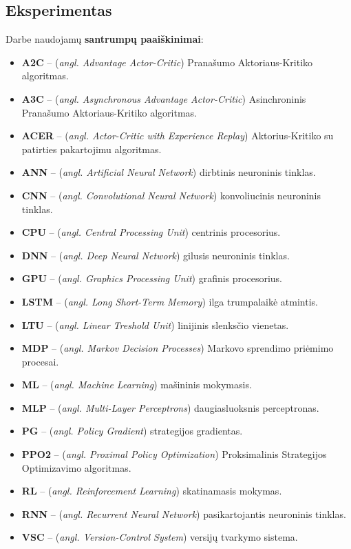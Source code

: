 \documentclass{VUMIFPSbakalaurinis}
\begin{document}
\subsection{Eksperimentas}

\printbibliography[heading=bibintoc] 

{
	Darbe naudojamų \textbf{santrumpų paaiškinimai}:
	\begin{itemize}
		\item \textbf{A2C} -- (\textit{angl. Advantage Actor-Critic}) Pranašumo Aktoriaus-Kritiko algoritmas.
		\item \textbf{A3C} -- (\textit{angl. Asynchronous Advantage Actor-Critic}) Asinchroninis Pranašumo Aktoriaus-Kritiko algoritmas.
		\item \textbf{ACER} -- (\textit{angl. Actor-Critic with Experience Replay}) Aktorius-Kritiko su patirties pakartojimu algoritmas.
		\item \textbf{ANN} -- (\textit{angl. Artificial Neural Network}) dirbtinis neuroninis tinklas.
		\item \textbf{CNN} -- (\textit{angl. Convolutional Neural Network}) konvoliucinis neuroninis tinklas.
		\item \textbf{CPU} -- (\textit{angl. Central Processing Unit}) centrinis procesorius.
		\item \textbf{DNN} -- (\textit{angl. Deep Neural Network}) gilusis neuroninis tinklas.
		\item \textbf{GPU} -- (\textit{angl. Graphics Processing Unit}) grafinis procesorius.
		\item \textbf{LSTM} -- (\textit{angl. Long Short-Term Memory}) ilga trumpalaikė atmintis.
		\item \textbf{LTU} -- (\textit{angl. Linear Treshold Unit}) linijinis slenksčio vienetas.
		\item \textbf{MDP} -- (\textit{angl. Markov Decision Processes}) Markovo sprendimo priėmimo procesai.
		\item \textbf{ML} -- (\textit{angl. Machine Learning}) mašininis mokymasis.
		\item \textbf{MLP} -- (\textit{angl. Multi-Layer Perceptrons}) daugiasluoksnis perceptronas.
		\item \textbf{PG} -- (\textit{angl. Policy Gradient}) strategijos gradientas.
		\item \textbf{PPO2} -- (\textit{angl. Proximal Policy Optimization}) Proksimalinis Strategijos Optimizavimo algoritmas.
		\item \textbf{RL} -- (\textit{angl. Reinforcement Learning}) skatinamasis mokymas.
		\item \textbf{RNN} -- (\textit{angl. Recurrent Neural Network}) pasikartojantis neuroninis tinklas.
		\item \textbf{VSC} -- (\textit{angl. Version-Control System}) versijų tvarkymo sistema.
	\end{itemize}
}

\end{document}
